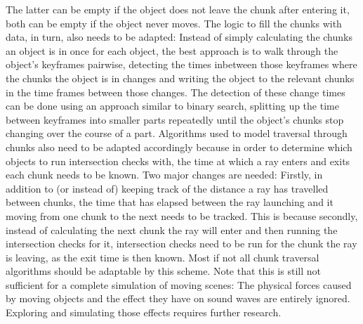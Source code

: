 The latter can be empty if the object does not leave the chunk after entering it,
both can be empty if the object never moves.
\newline
The logic to fill the chunks with data, in turn, also needs to be adapted:
Instead of simply calculating the chunks an object is in once for each object,
the best approach is to walk through the object's keyframes pairwise,
detecting the times inbetween those keyframes where the chunks the object is in changes
and writing the object to the relevant chunks in the time frames between those changes.
The detection of these change times can be done using an approach similar to binary search,
splitting up the time between keyframes into smaller parts repeatedly
until the object's chunks stop changing over the course of a part.
\newline
Algorithms used to model traversal through chunks also need to be adapted accordingly
because in order to determine which objects to run intersection checks with,
the time at which a ray enters and exits each chunk needs to be known.
\newline
Two major changes are needed:
Firstly, in addition to (or instead of) keeping track of the distance a ray has travelled between chunks,
the time that has elapsed between the ray launching and it moving from one chunk to the next needs to be tracked.
This is because secondly, instead of calculating the next chunk the ray will enter and then running the intersection checks for it,
intersection checks need to be run for the chunk the ray is leaving, as the exit time is then known.
\newline
Most if not all chunk traversal algorithms should be adaptable by this scheme.
\newline
Note that this is still not sufficient for a complete simulation of moving scenes:
The physical forces caused by moving objects and the effect they have on sound waves are entirely ignored.
Exploring and simulating those effects requires further research.

